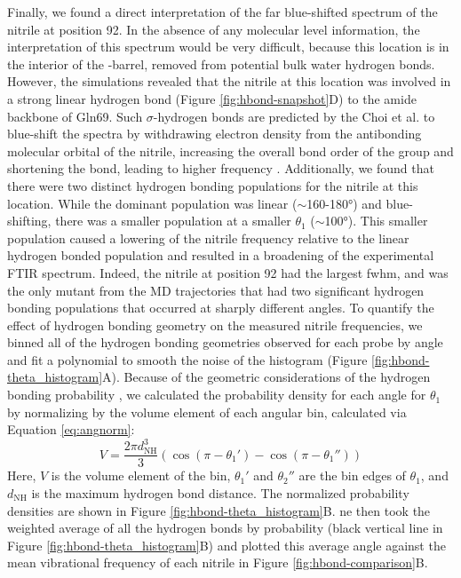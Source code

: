 Finally, we found a direct interpretation of the far blue-shifted spectrum of the nitrile at position 92.
In the absence of any molecular level information, the interpretation of this spectrum would be very difficult, because this location is in the interior of the \textbeta{}-barrel, removed from potential bulk water hydrogen bonds.
However, the simulations revealed that the nitrile at this location was involved in a strong linear hydrogen bond (Figure \ref{fig:hbond-snapshot}D) to the amide backbone of Gln69.
Such $\sigma$-hydrogen bonds are predicted by the Choi et al. to blue-shift the spectra by withdrawing electron density from the antibonding molecular orbital of the nitrile, increasing the overall bond order of the group and shortening the bond, leading to higher frequency \cite{Getahun2003, Adhikary2014, Eaton1988}.
Additionally, we found that there were two distinct hydrogen bonding populations for the nitrile at this location.
While the dominant population was linear ($\sim$160-\ang{180}) and blue-shifting, there was a smaller population at a smaller $\theta_1$ ($\sim$\ang{100}).
This smaller population caused a lowering of the nitrile frequency relative to the linear hydrogen bonded population and resulted in a broadening of the experimental FTIR spectrum.
Indeed, the nitrile at position 92 had the largest fwhm, and was the only mutant from the MD trajectories that had two significant hydrogen bonding populations that occurred at sharply different angles. 
To quantify the effect of hydrogen bonding geometry on the measured nitrile frequencies, we binned all of the hydrogen bonding geometries observed for each probe by angle and fit a polynomial to smooth the noise of the histogram (Figure \ref{fig:hbond-theta_histogram}A).
Because of the geometric considerations of the hydrogen bonding probability \cite{Kroon1975}, we calculated the probability density for each angle for $\theta_1$ by normalizing by the volume element of each angular bin, calculated via Equation \ref{eq:angnorm}: 
\begin{equation}
    V = \frac{2\pi d^3_{\text{NH}}}{3}(\cos(\pi-\theta_1') - \cos(\pi - \theta_1'')) 
    \label{eq:angnorm}
\end{equation}
Here, $V$ is the volume element of the bin, $\theta_1'$ and $\theta_2''$ are the bin edges of $\theta_1$, and $d_{\text{NH}}$ is the maximum hydrogen bond distance.
The normalized probability densities are shown in Figure \ref{fig:hbond-theta_histogram}B.
ne then took the weighted average of all the hydrogen bonds by probability (black vertical line in Figure \ref{fig:hbond-theta_histogram}B) and plotted this average angle against the mean vibrational frequency of each nitrile in Figure \ref{fig:hbond-comparison}B. 

